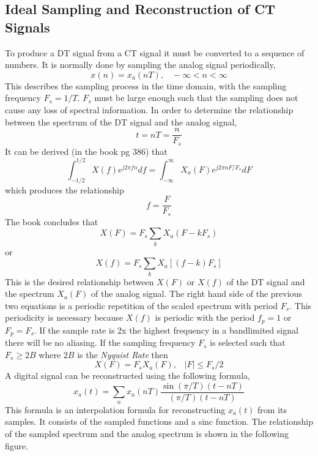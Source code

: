 \documentclass{article} %
\begin{document}
    \subsection{Ideal Sampling and Reconstruction of CT Signals}
    To produce a DT signal from a CT signal it must be converted to a sequence of numbers. It is normally done by sampling the analog signal periodically, 
    \begin{equation}
	x(n) = x_a(nT), \;\;\; -\infty < n < \infty
	\end{equation}
    This describes the sampling process in the time domain, with the sampling frequency $F_s = 1/T$. $F_s$ must be large enough such that the sampling does not cause any loss of spectral information. In order to determine the relationship between the spectrum of the DT signal and the analog signal, 
    \begin{equation}
	t = nT = \frac{n}{F_s}
	\end{equation}
	It can be derived (in the book pg 386) that
	\begin{equation}
	\int_{-1/2}^{1/2}X(f)e^{j2\pi fn}df = \int_{-\infty}^{\infty}X_a(F)e^{j2\pi nF/F_s}dF
	\end{equation}
	which produces the relationship
	\begin{equation}
	f = \frac{F}{F_s}
	\end{equation}
	The book concludes that 
	\begin{equation}
	X(F) = F_s \sum_k X_a(F-kF_s)
	\end{equation}
	or 
	\begin{equation}
	X(f) = F_s \sum_k X_a[(f-k)F_s]
	\end{equation}
	This is the desired relationship between $X(F)$ or $X(f)$ of the DT signal and the spectrum $X_a(F)$ of the analog signal. The right hand side of the previous two equations is a periodic repetition of the scaled spectrum with period $F_s$. This periodicity is necessary because $X(f)$ is periodic with the period $f_p = 1$ or $F_p = F_s$. If the sample rate is 2x the highest frequency in a bandlimited signal there will be no aliasing. If the sampling frequency $F_s$ is selected such that $F_s \ge 2B$ where $2B$ is the \textit{Nyquist Rate} then
	\begin{equation}
	X(F) = F_s X_a(F), \;\;\; |F| \le F_s/2
	\end{equation}
	A digital signal can be reconstructed using the following formula,
	\begin{equation}
	x_a(t) = \sum_n x_a(nT) \frac{\sin (\pi /T)(t-nT)}{(\pi /T)(t-nT)}
	\end{equation}
	This formula is an interpolation formula for reconstructing $x_a(t)$ from its samples. It consists of the sampled functions and a sinc function. The relationship of the sampled spectrum and the analog spectrum is shown in the following figure. 
   
\end{document}
